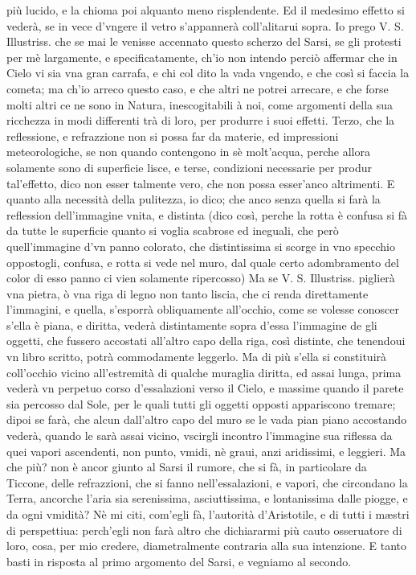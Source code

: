 \documentclass[11pt,twoside,openany]{book}
\begin{document}
più lucido, e la chioma poi alquanto meno risplendente. Ed il medesimo effetto si vederà, se in vece d'vngere il vetro s'appannerà coll'alitarui sopra. Io prego V. S. Illustriss. che se mai le venisse accennato questo scherzo del Sarsi, se gli protesti per mè largamente, e specificatamente, ch'io non intendo perciò affermar che in Cielo vi sia vna gran carrafa, e chi col dito la vada vngendo, e che così si faccia la cometa; ma ch'io arreco questo caso, e che altri ne potrei arrecare, e che forse molti altri ce ne sono in Natura, inescogitabili à noi, come argomenti della sua ricchezza in modi differenti trà di loro, per produrre i suoi effetti. Terzo, che la reflessione, e refrazzione non si possa far da materie, ed impressioni meteorologiche, se non quando contengono in sè molt'acqua, perche allora solamente sono di superficie lisce, e terse, condizioni necessarie per produr tal'effetto, dico non esser talmente vero, che non possa esser'anco altrimenti. E quanto alla necessità della pulitezza, io dico; che anco senza quella si farà la reflession dell'immagine vnita, e distinta (dico così, perche la rotta è confusa si fà da tutte le superficie quanto si voglia scabrose ed ineguali, che però quell'immagine d'vn panno colorato, che distintissima si scorge in vno specchio oppostogli, confusa, e rotta si vede nel muro, dal quale certo adombramento del color di esso panno ci vien solamente ripercosso) Ma se V. S. Illustriss. piglierà vna pietra, ò vna riga di legno non tanto liscia, che ci renda direttamente l'immagini, e quella, s'esporrà obliquamente all'occhio, come se volesse conoscer s'ella è piana, e diritta, vederà distintamente sopra d'essa l'immagine de gli oggetti, che fussero accostati all'altro capo della riga, così distinte, che tenendoui vn libro scritto, potrà commodamente leggerlo. Ma di più s'ella si constituirà coll'occhio vicino all'estremità di qualche muraglia diritta, ed assai lunga, prima vederà vn perpetuo corso d'essalazioni verso il Cielo, e massime quando il parete sia percosso dal Sole, per le quali tutti gli oggetti opposti appariscono tremare; dipoi se farà, che alcun dall'altro capo del muro se le vada pian piano accostando vederà, quando le sarà assai vicino, vscirgli incontro l'immagine sua riflessa da quei vapori ascendenti, non punto, vmidi, nè graui, anzi aridissimi, e leggieri. Ma che più? non è ancor giunto al Sarsi il rumore, che si fà, in particolare da Ticcone, delle refrazzioni, che si fanno nell'essalazioni, e vapori, che circondano la Terra, ancorche l'aria sia serenissima, asciuttissima, e lontanissima dalle piogge, e da ogni vmidità? Nè mi citi, com'egli fà, l'autorità d'Aristotile, e di tutti i mæstri di perspettiua: perch'egli non farà altro che dichiararmi più cauto osseruatore di loro, cosa, per mio credere, diametralmente contraria alla sua intenzione. E tanto basti in risposta al primo argomento del Sarsi, e vegniamo al secondo.
\end{document}

